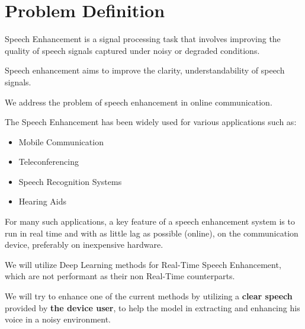 \section{Problem Definition}
Speech Enhancement is a signal processing task that involves improving the quality of speech signals captured under noisy or degraded conditions.

Speech enhancement aims to improve the clarity, understandability of speech signals.

We address the problem of speech enhancement in online communication.

The Speech Enhancement has been widely used for various applications such as:

\begin{itemize}
    \item Mobile Communication
    \item Teleconferencing
    \item Speech Recognition Systems
    \item Hearing Aids
\end{itemize}

For many such applications, a key feature of a speech enhancement system is to run in real time and with as little lag as possible (online), on the communication device, preferably on inexpensive hardware.

We will utilize Deep Learning methods for Real-Time Speech Enhancement, which are not performant as their non Real-Time counterparts.

We will try to enhance one of the current methods by utilizing a \textbf{clear speech} provided by \textbf{the device user}, to help the model in extracting and enhancing his voice in a noisy environment.